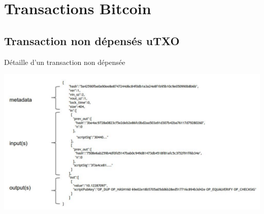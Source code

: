 \documentclass[presentation]{beamer}
\begin{document}
\section{Transactions Bitcoin}
\label{sec:org693f967}
\subsection{Transaction non dépensés uTXO}
\label{sec:orgb7b9c2a}
\begin{frame}[label={sec:org19312a9}]{Détaille d'un transaction non dépensée}
\begin{center}
\includegraphics[width=.9\textwidth]{Images/transaction_btc.png}
\end{center}
\end{frame}
\end{document}
